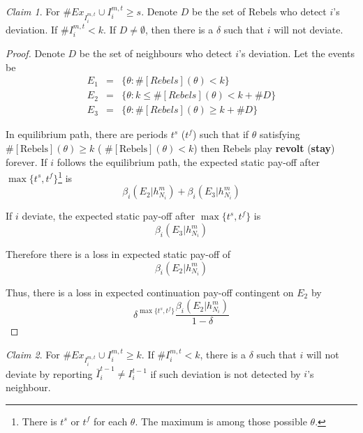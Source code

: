 \documentclass[12pt,letter]{article}
\theoremstyle{definition}
\theoremstyle{remark}
\theoremstyle{claim}
\newtheorem{claim}{Claim}
\begin{document}
\begin{claim} 
\label{claim_detection_reporting_period}
For $\#Ex_{I^{m,t}_i}\cup I^{m,t}_i\geq s$. Denote $D$ be the set of Rebels who detect $i$'s deviation. If $\# I^{m,t}_i<k$. If $D\neq \emptyset$, then there is a $\delta$ such that $i$ will not deviate.
\end{claim}
\begin{proof}

Denote $D$ be the set of neighbours who detect $i$'s deviation. Let the events be
\begin{eqnarray*}
E_1 	&= &\{\theta: \#[Rebels](\theta)< k\}\\
E_2 	&= &\{\theta: k\leq \#[Rebels](\theta)<k+\# D\}\\
E_3 	&= &\{\theta: \#[Rebels](\theta)\geq k+\# D\}
\end{eqnarray*}

In equilibrium path, there are periods $t^{s}$ ($t^{f}$) such that if $\theta$ satisfying $\#[\text{Rebels}](\theta)\geq k$ ( $\#[\text{Rebels}](\theta)< k$) then Rebels play \textbf{revolt} (\textbf{stay}) forever. If $i$ follows the equilibrium path, the expected static pay-off after $\max\{t^s,t^f\}$\footnote{There is $t^{s}$ or $t^{f}$ for each $\theta$. The maximum is among those possible $\theta$.} is
 \[\beta_{i}(E_2|h^{m}_{N_i})+\beta_{i}(E_3|h^{m}_{N_i})\]

If $i$ deviate, the expected static pay-off after $\max\{t^s,t^f\}$ is
 \[\beta_{i}(E_3|h^{m}_{N_i})\]
 
Therefore there is a loss in expected static pay-off of
\[\beta_{i}(E_2|h^{m}_{N_i})\]

Thus, there is a loss in expected continuation pay-off contingent on $E_2$ by
\[\delta^{\max\{t^s,t^f\}}\frac{\beta_{i}(E_2|h^{m}_{N_i})}{1-\delta}\]

\end{proof}



\begin{claim} 
\label{claim_deviation_higher_reporting}
For $\# Ex_{I^{m,t}_i}\cup I^{m,t}_i \geq k$. If $\# I^{m,t}_i<k$, there is a $\delta$ such that $i$ will not deviate by reporting $\bar{I}^{t-1}_i\neq I^{t-1}_i$ if such deviation is not detected by $i$'s neighbour.
\end{claim}
\end{document}

